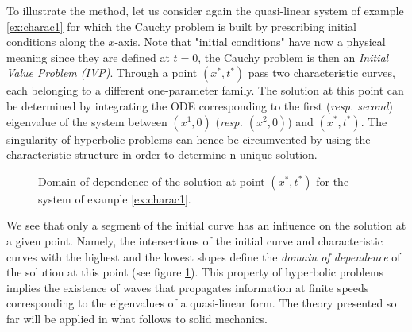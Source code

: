 To illustrate the method, let us consider again the quasi-linear system of example \ref{ex:charac1} for which the Cauchy problem is built by prescribing initial conditions along the $x$-axis. Note that "initial conditions" have now a physical meaning since they are defined at $t=0$, the Cauchy problem is then an \textit{Initial Value Problem (IVP)}. Through a point $(x^*,t^*)$ pass two characteristic curves, each belonging to a different one-parameter family. The solution at this point can be determined by integrating the ODE corresponding to the first (\textit{resp. second}) eigenvalue of the system between $(x^1,0)$ (\textit{resp. $(x^2,0)$}) and $(x^*,t^*)$. The singularity of hyperbolic problems can hence be circumvented by using the characteristic structure in order to determine n unique solution. 
\begin{figure}[h]
  \centering
  
  \caption{Domain of dependence of the solution at point $(x^*,t^*)$ for the system of example \ref{ex:charac1}.}
  \label{fig:charac_method2x2}
\end{figure}
We see that only a segment of the initial curve has an influence on the solution at a given point. Namely, the intersections of the initial curve and characteristic curves with the highest and the lowest slopes define the \textit{domain of dependence} of the solution at this point (see figure \ref{fig:charac_method2x2}). This property of hyperbolic problems implies the existence of waves that propagates information at finite speeds corresponding to the eigenvalues of a quasi-linear form. The theory presented so far will be applied in what follows to solid mechanics.



